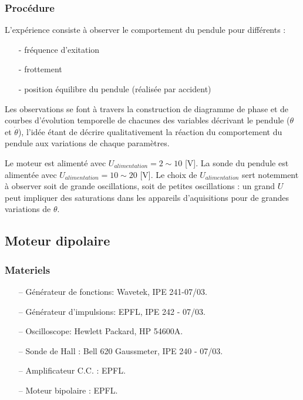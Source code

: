 \documentclass[a4paper,12pt,oneside]{article}
\begin{document}
\subsubsection{Procédure}

L'expérience consiste à observer le comportement du pendule pour différents :
\begin{itemize}
  \item[-] fréquence d'exitation
  \item[-] frottement
  \item[-] position équilibre du pendule (réalisée par accident)
\end{itemize}

Les observations se font à travers la construction de diagramme de phase et de courbes d'évolution temporelle de chacunes des variables décrivant le pendule ($\theta$ et $\dot{\theta}$), l'idée étant de décrire qualitativement la réaction du comportement du pendule aux variations de chaque paramètres.


Le moteur est alimenté avec $U_{alimentation}=2\sim10$ [V].
La sonde du pendule est alimentée avec $U_{alimentation}=10\sim20$ [V]. Le choix de $U_{alimentation}$ sert notemment à observer soit de grande oscillations, soit de petites oscillations : un grand $U$ peut impliquer des saturations dans les appareils d'aquisitions pour de grandes variations de $\theta$.
\subsection{Moteur dipolaire}

\subsubsection{Materiels}
\begin{itemize}
  \item[--] Générateur de fonctions: Wavetek, IPE 241-07/03.
  \item[--] Générateur d’impulsions: EPFL, IPE 242 - 07/03.
  \item[--] Oscilloscope: Hewlett Packard, HP 54600A.
  \item[--] Sonde de Hall : Bell 620 Gaussmeter, IPE 240 - 07/03.
  \item[--] Amplificateur C.C. : EPFL.
  \item[--] Moteur bipolaire : EPFL.
\end{itemize}
\end{document}
